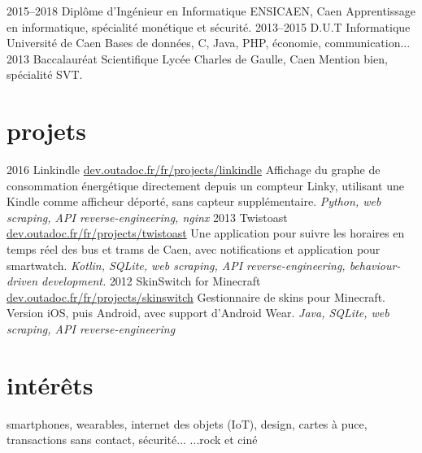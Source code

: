 \documentclass[]{friggeri-cv}
\begin{document}
\begin{entrylist}
    \entry
    {2015--2018}
    {Diplôme d’Ingénieur {\normalfont en Informatique}}
    {ENSICAEN, Caen}
    {Apprentissage en informatique, spécialité monétique et sécurité.}
    \entry
    {2013--2015}
    {D.U.T {\normalfont Informatique}}
    {Université de Caen}
    {Bases de données, C, Java, PHP, économie, communication...}
    \entry
    {2013}
    {Baccalauréat {\normalfont Scientifique}}
    {Lycée Charles de Gaulle, Caen}
    {Mention bien, spécialité SVT.}
\end{entrylist}

\section{projets}

\begin{entrylist}
	\entry
	{2016}
	{Linkindle}
	{\href{https://dev.outadoc.fr/fr/projects/linkindle}{dev.outadoc.fr/fr/projects/linkindle}}
	{Affichage du graphe de consommation énergétique directement depuis un compteur Linky, utilisant une Kindle comme afficheur déporté, sans capteur supplémentaire.
	\emph{Python, web scraping, API reverse-engineering, nginx}}
    \entry
    {2013}
    {Twistoast}
    {\href{https://dev.outadoc.fr/fr/projects/twistoast}{dev.outadoc.fr/fr/projects/twistoast}}
    {Une application pour suivre les horaires en temps réel des bus et trams de Caen, avec notifications et application pour smartwatch.
    \emph{Kotlin, SQLite, web scraping, API reverse-engineering, behaviour-driven development.}}
    \entry
    {2012}
    {SkinSwitch for Minecraft}
    {\href{https://dev.outadoc.fr/fr/projects/skinswitch}{dev.outadoc.fr/fr/projects/skinswitch}}
    {Gestionnaire de skins pour Minecraft. Version iOS, puis Android, avec support d'Android Wear.
    \emph{Java, SQLite, web scraping, API reverse-engineering}}
\end{entrylist}

\section{intérêts}

smartphones, wearables, internet des objets (IoT), design, cartes à puce, transactions sans contact, sécurité...
...rock et ciné
\end{document}
